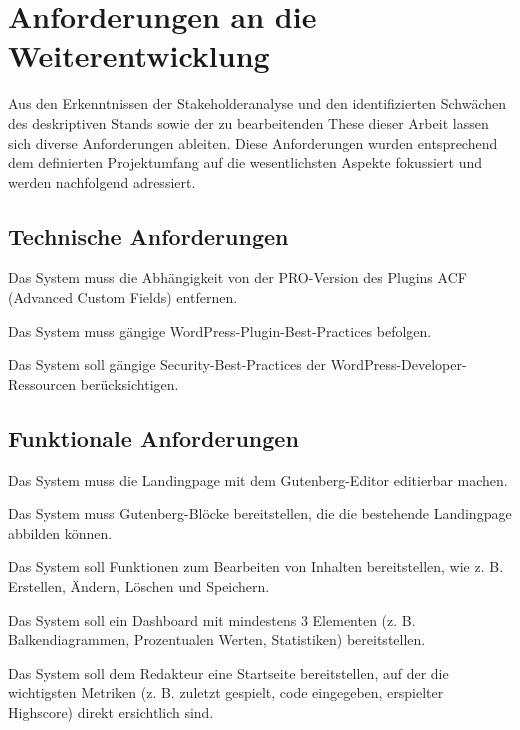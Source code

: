 \section{Anforderungen an die Weiterentwicklung}
Aus den Erkenntnissen der Stakeholderanalyse und den identifizierten Schwächen des deskriptiven Stands sowie der zu bearbeitenden These dieser Arbeit lassen sich diverse Anforderungen ableiten.
Diese Anforderungen wurden entsprechend dem definierten Projektumfang auf die wesentlichsten Aspekte fokussiert und werden nachfolgend adressiert.

\subsection{Technische Anforderungen}
\begin{enumerate}[label={[T\arabic*]},ref=T\arabic*]
    \item \label{T1} Das System muss die Abhängigkeit von der PRO-Version des Plugins ACF (Advanced Custom Fields) entfernen.
    \item \label{T2} Das System muss gängige WordPress-Plugin-Best-Practices befolgen.
    \item \label{T3} Das System soll gängige Security-Best-Practices der WordPress-Developer-Ressourcen berücksichtigen.
\end{enumerate}

\subsection{Funktionale Anforderungen}
\begin{enumerate}[label={[F\arabic*]},ref=F\arabic*]
    \item \label{F1} Das System muss die Landingpage mit dem Gutenberg-Editor editierbar machen.
    \item \label{F2} Das System muss Gutenberg-Blöcke bereitstellen, die die bestehende Landingpage abbilden können.
    \item \label{F3} Das System soll Funktionen zum Bearbeiten von Inhalten bereitstellen, wie z. B. Erstellen, Ändern, Löschen und Speichern.
    \item \label{F4} Das System soll ein Dashboard mit mindestens 3 Elementen (z. B. Balkendiagrammen, Prozentualen Werten, Statistiken) bereitstellen.
    \item \label{F5} Das System soll dem Redakteur eine Startseite bereitstellen, auf der die wichtigsten Metriken (z. B. zuletzt gespielt, code eingegeben, erspielter Highscore) direkt ersichtlich sind.
\end{enumerate}

